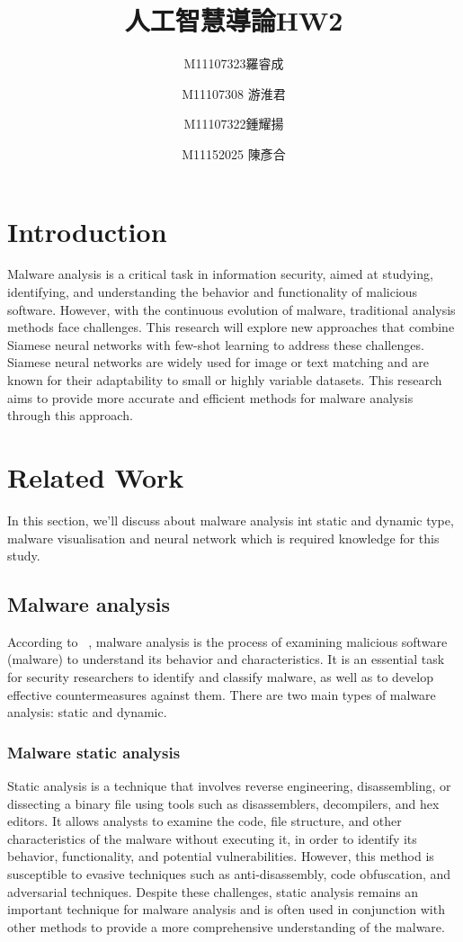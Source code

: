 \documentclass{article}
\title{人工智慧導論HW2}
\author{M11107323羅睿成 \and M11107308 游淮君 \and M11107322鍾耀揚 \and M11152025 陳彥合}
\begin{document}
\maketitle
\section{Introduction}
Malware analysis is a critical task in information security, aimed at studying, identifying, and understanding the behavior and functionality of malicious software. 
However, with the continuous evolution of malware, traditional analysis methods face challenges. 
This research will explore new approaches that combine Siamese neural networks with few-shot learning to address these challenges. 
Siamese neural networks are widely used for image or text matching and are known for their adaptability to small or highly variable datasets. 
This research aims to provide more accurate and efficient methods for malware analysis through this approach.

\section{Related Work}
In this section, we'll discuss about malware analysis int static and dynamic type, malware visualisation and neural network which is
required knowledge for this study.
\subsection{Malware analysis}
According to ~\cite{ref1}, malware analysis is the process of examining malicious software (malware) to understand its behavior and characteristics. It is an essential task for security researchers to identify and classify malware, as well as to develop effective countermeasures against them. There are two main types of malware analysis: static and dynamic.
\subsubsection{Malware static analysis}
Static analysis is a technique that involves reverse engineering, disassembling, or dissecting a binary file using tools such as disassemblers, decompilers, and hex editors. It allows analysts to examine the code, file structure, and other characteristics of the malware without executing it, in order to identify its behavior, functionality, and potential vulnerabilities. However, this method is susceptible to evasive techniques such as anti-disassembly, code obfuscation, and adversarial techniques. Despite these challenges, static analysis remains an important technique for malware analysis and is often used in conjunction with other methods to provide a more comprehensive understanding of the malware.
\end{document}
